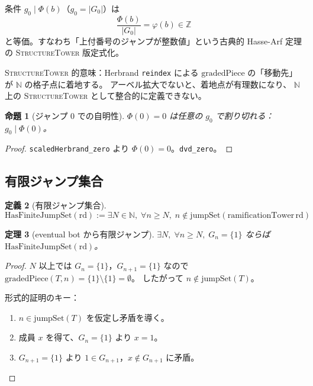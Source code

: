 \documentclass[a4paper,11pt]{ltjsarticle}
\theoremstyle{definition}
\newtheorem{definition}{定義}[section]
\theoremstyle{plain}
\newtheorem{theorem}[definition]{定理}
\newtheorem{proposition}[definition]{命題}
\theoremstyle{remark}
\newcommand{\Phi}{\varPhi}
\begin{document}
\begin{mathinsight}
条件 $g_0 \mid \Phi(b)$（$g_0 = |G_0|$）は
\[
  \frac{\Phi(b)}{|G_0|} = \varphi(b) \in \mathbb{Z}
\]
と等価。すなわち「上付番号のジャンプが整数値」という古典的 Hasse-Arf 定理の
\textsc{StructureTower} 版定式化。

\textsc{StructureTower} 的意味：Herbrand \texttt{reindex} による
$\mathrm{gradedPiece}$ の「移動先」が $\mathbb{N}$ の格子点に着地する。
アーベル拡大でないと、着地点が有理数になり、
$\mathbb{N}$ 上の \textsc{StructureTower} として整合的に定義できない。
\end{mathinsight}

\begin{proposition}[ジャンプ 0 での自明性]\label{prop:hasse-arf-zero}
  $\Phi(0) = 0$ は任意の $g_0$ で割り切れる：$g_0 \mid \Phi(0)$。
\end{proposition}

\begin{proof}
  \texttt{scaledHerbrand\_zero} より $\Phi(0) = 0$。\texttt{dvd\_zero}。
\end{proof}

\subsection{有限ジャンプ集合}

\begin{definition}[有限ジャンプ集合]\label{def:finite-jump-set}
  \[
    \mathrm{HasFiniteJumpSet}(\mathrm{rd}) :=
    \exists N \in \mathbb{N},\; \forall n \geq N,\; n \notin \mathrm{jumpSet}(\mathrm{ramificationTower}\,\mathrm{rd})
  \]
\end{definition}

\begin{theorem}[eventual bot から有限ジャンプ]\label{thm:finite-jump-eventual-bot}
  $\exists N,\;\forall n \geq N,\;G_n = \{1\}$ ならば $\mathrm{HasFiniteJumpSet}(\mathrm{rd})$。
\end{theorem}

\begin{proof}
  $N$ 以上では $G_n = \{1\}$，$G_{n+1} = \{1\}$ なので
  $\mathrm{gradedPiece}(T,n) = \{1\} \setminus \{1\} = \emptyset$。
  したがって $n \notin \mathrm{jumpSet}(T)$。

  形式的証明のキー：
  \begin{enumerate}
    \item $n \in \mathrm{jumpSet}(T)$ を仮定し矛盾を導く。
    \item 成員 $x$ を得て、$G_n = \{1\}$ より $x = 1$。
    \item $G_{n+1} = \{1\}$ より $1 \in G_{n+1}$，$x \notin G_{n+1}$ に矛盾。
  \end{enumerate}
\end{proof}
\end{document}
